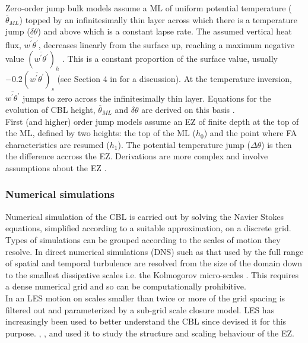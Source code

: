 Zero-order jump bulk models assume a ML of uniform potential temperature ($\overline{\theta}_{ML}$) topped by an infinitesimally thin layer across which there is a temperature jump ($\delta \theta$) and above which is a constant lapse rate.  The assumed vertical heat flux, $\overline{w^{'}\theta^{'}}$, decreases linearly from the surface up, reaching a maximum negative value $(\overline{w^{'}\theta^{'}})_{h}$ .  This is a constant proportion of the surface value, usually $-0.2(\overline{w^{'}\theta^{'}})_{s}$ (see Section 4 in \cite{Tennekes73} for a discussion). At the temperature inversion, $\overline{w^{'}\theta^{'}}$ jumps to zero across the infinitesimally thin layer.  Equations for the evolution of CBL height, $\overline{\theta}_{ML}$ and $\delta \theta$ are derived on this basis \citep{Tennekes73}.\\

First (and higher) order jump models assume an EZ of finite depth at the top of the ML, defined by two heights:  the top of the ML ($h_{0}$) and the point where FA characteristics are resumed ($h_{1}$).  The potential temperature jump ($\Delta \theta$) is then the difference accross the EZ.  Derivations are more complex and involve assumptions about the EZ \citep{Betts74, BatchGryn, Stull73, Deardorff79, FedConzMir04}.\\

\subsubsection{Numerical simulations}
\label{subsec:numsim}

Numerical simulation of the CBL is carried out by solving the Navier Stokes equations, simplified according to a suitable approximation, on a discrete grid.  Types of simulations can be grouped according to the scales of motion they resolve.  In direct numerical simulations (DNS) such as that used by \cite{GarciaMellado} the full range of spatial and temporal turbulence are resolved from the size of the domain down to the smallest dissipative scales i.e. the Kolmogorov micro-scales \citep{Kolmog}.  This requires a dense numerical grid and so can be computationally prohibitive.\\

In an LES motion on scales smaller than twice or more of the grid spacing is filtered out and parameterized by a sub-grid scale closure model. LES has increasingly been used to better understand the CBL since \cite{Deardorff72} devised it for this purpose.  \cite{SullMoengStev}, \cite{FedConzMir04}, \cite{EbSchu} and \cite{BrooksFowler2} used it to study the structure and scaling behaviour of the EZ.\\

